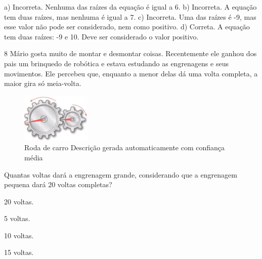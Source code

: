 {{{\begin{escolha}
{{{{\begin{escolha}
\begin{escolha}
{{a) Incorreta. Nenhuma das raízes da equação é igual a 6.
b) Incorreta. A equação tem duas raízes, mas nenhuma é igual a 7.
c) Incorreta. Uma das raízes é -9, mas esse valor não pode ser considerado, nem como positivo.
d) Correta. A equação tem duas raízes: -9 e 10. Deve ser considerado o valor positivo.}

\num{8} Mário gosta muito de montar e desmontar coisas. Recentemente ele 
ganhou dos pais um brinquedo de robótica e estava estudando as engrenagens
e seus movimentos. Ele percebeu que, enquanto a menor delas dá uma volta
completa, a maior gira só meia-volta.

\begin{figure}
\centering
\includegraphics[width=1.30208in,height=0.92708in]{./_SAEB_9_MAT/media/image251.png}
\caption{Roda de carro Descrição gerada automaticamente com confiança
média}
\end{figure}


Quantas voltas dará a engrenagem grande, considerando que a engrenagem
pequena dará 20 voltas completas?

\begin{escolha}

  \item 20 voltas.

  \item 5 voltas.

  \item 10 voltas.

  \item 15 voltas.

\end{escolha}

}
\end{escolha}
\end{escolha}}}}}
\end{escolha}}}}
